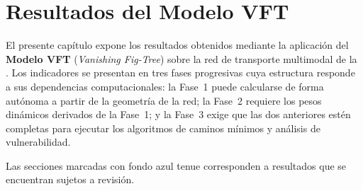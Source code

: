 \chapter{Resultados del Modelo VFT}
\label{ch:resultados-vft}

El presente capítulo expone los resultados obtenidos mediante la aplicación del
\textbf{Modelo VFT} (\textit{Vanishing Fig-Tree}) sobre la red de transporte
multimodal de la \zmvm. Los indicadores se presentan en tres fases progresivas
cuya estructura responde a sus dependencias computacionales: la Fase~1 puede
calcularse de forma autónoma a partir de la geometría de la red; la Fase~2
requiere los pesos dinámicos derivados de la Fase~1; y la Fase~3 exige que las
dos anteriores estén completas para ejecutar los algoritmos de caminos mínimos y
análisis de vulnerabilidad.

Las secciones marcadas con fondo \colorbox{azulRevision}{azul tenue}
corresponden a resultados que se encuentran sujetos a revisión.





